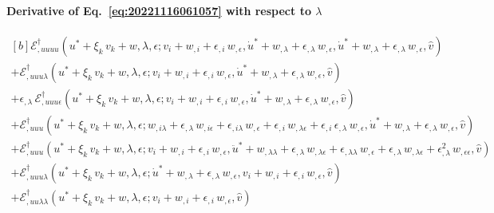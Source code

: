 \documentclass[12pt, final]{scrartcl}
\theoremstyle{definition}
\newcommand{\EE}{\mathcal E ^ \dagger}
\begin{document}
\paragraph{Derivative of Eq.~\eqref{eq:20221116061057} with respect to \(\lambda\)}
\begin{equation}
  \begin{aligned}[b]
    \EE_{,uuuu}(u^\ast + \xi_k \, v_k + w, \lambda, \epsilon; v_i + w_{,i} + \epsilon_{,i} \, w_{,\epsilon}, \dot{u}^\ast + w_{,\lambda} + \epsilon_{,\lambda} \, w_{,\epsilon}, \dot{u}^\ast + w_{,\lambda} + \epsilon_{,\lambda} \, w_{,\epsilon}, \hat{v}) &\\
    + \EE_{,uuu\lambda}(u^\ast + \xi_k \, v_k + w, \lambda, \epsilon; v_i + w_{,i} + \epsilon_{,i} \, w_{,\epsilon}, \dot{u}^\ast + w_{,\lambda} + \epsilon_{,\lambda} \, w_{,\epsilon}, \hat{v}) &\\
    + \epsilon_{,\lambda} \, \EE_{,uuu\epsilon}(u^\ast + \xi_k \, v_k + w, \lambda, \epsilon; v_i + w_{,i} + \epsilon_{,i} \, w_{,\epsilon}, \dot{u}^\ast + w_{,\lambda} + \epsilon_{,\lambda} \, w_{,\epsilon}, \hat{v}) &\\
    + \EE_{,uuu}(u^\ast + \xi_k \, v_k + w, \lambda, \epsilon; w_{,i\lambda} + \epsilon_{,\lambda} \, w_{,i\epsilon} + \epsilon_{,i\lambda} \, w_{,\epsilon} + \epsilon_{,i} \, w_{,\lambda\epsilon} + \epsilon_{,i} \, \epsilon_{,\lambda} \, w_{,\epsilon}, \dot{u}^\ast + w_{,\lambda} + \epsilon_{,\lambda} \, w_{,\epsilon}, \hat{v}) &\\
    + \EE_{,uuu}(u^\ast + \xi_k \, v_k + w, \lambda, \epsilon; v_i + w_{,i} + \epsilon_{,i} \, w_{,\epsilon}, \ddot{u}^\ast + w_{,\lambda\lambda} + \epsilon_{,\lambda} \, w_{,\lambda\epsilon} + \epsilon_{,\lambda\lambda} \, w_{, \epsilon} + \epsilon_{,\lambda} \, w_{,\lambda\epsilon} + \epsilon_{,\lambda}^2 \, w_{,\epsilon\epsilon}, \hat{v}) &\\
    + \EE_{,uuu\lambda}(u^\ast + \xi_k \, v_k + w, \lambda, \epsilon; \dot{u}^\ast + w_{,\lambda} + \epsilon_{,\lambda} \, w_{,\epsilon}, v_i + w_{,i} + \epsilon_{,i} \, w_{,\epsilon}, \hat{v}) &\\
    + \EE_{,uu\lambda\lambda}(u^\ast + \xi_k \, v_k + w, \lambda, \epsilon; v_i + w_{,i} + \epsilon_{,i} \, w_{,\epsilon}, \hat{v}) &\\

\end{aligned}
\end{equation}
\end{document}
